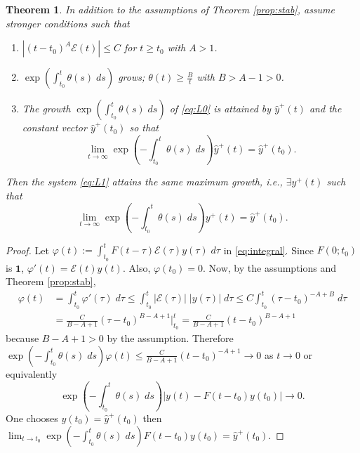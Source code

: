 \documentclass[a4paper,11pt]{article}
\newcounter{Theorem}
\newtheorem{theorem}[Theorem]{Theorem}
\theoremstyle{remark}
\begin{document}
\begin{theorem} \label{prop:stab2}
In addition to the assumptions of Theorem \ref{prop:stab}, assume stronger conditions such that
\begin{enumerate}
  \item $|(t-t_0)^A \mathcal{E}(t)| \le C$ for $t\ge t_0$ with $A>1$. 
  \item $\exp\left(\int_{t_0}^t \theta(s)\; ds\right)$ grows; $\theta(t) \ge \frac{B}{t}$ with $B>A-1>0$.
  \item The growth $\exp\left(\int_{t_0}^t \theta(s)\; ds\right)$ of \eqref{eq:L0} is attained by $\hat{y}^+(t)$ and the constant vector $\hat{y}^+(t_0)$ so that 
  $$ \lim_{t \rightarrow \infty} \exp\left(-\int_{t_0}^t \theta(s)\; ds\right)\hat{y}^+(t) = \hat{y}^+(t_0).$$
\end{enumerate}
Then the system \eqref{eq:L1} attains the same maximum growth, i.e., $\exists {y}^+(t)$  such that
  $$ \lim_{t \rightarrow \infty} \exp\left(-\int_{t_0}^t \theta(s)\; ds\right){y}^+(t) = \hat{y}^+(t_0).$$
\end{theorem}
\begin{proof}
Let $\varphi(t):= \int_{t_0}^t F(t-\tau) \mathcal{E}(\tau)y(\tau) \; d\tau$ in \eqref{eq:integral}. Since $F(0;t_0)$ is $\mathbf{1}$, $\varphi'(t) = \mathcal{E}(t)y(t)$. Also, $\varphi(t_0)=0$. Now, by the assumptions and Theorem \ref{prop:stab},
\begin{align*}
 \varphi(t) &= \int_{t_0}^t \varphi'(\tau) \;d\tau \le \int_{t_0}^t |\mathcal{E}(\tau)|\;|y(\tau)| \;d\tau \le C\int_{t_0}^t (\tau-t_0)^{-A+B} \;d\tau \\
            &= \frac{C}{B-A+1} (\tau-t_0)^{B-A+1}\bigg|^t_{t_0} = \frac{C}{B-A+1} (t-t_0)^{B-A+1}
\end{align*}
because $B-A+1>0$ by the assumption. Therefore $\exp\left(-\int_{t_0}^t \theta(s)\; ds\right)\varphi(t) \le \frac{C}{B-A+1} (t-t_0)^{-A+1} \rightarrow 0$ as $t \rightarrow 0$ or equivalently
$$ \exp\left(-\int_{t_0}^t \theta(s)\; ds\right)\big|y(t)-F(t-t_0)y(t_0)\big| \rightarrow 0.$$
One chooses $y(t_0)=\hat{y}^+(t_0)$ then $\displaystyle\lim_{t\rightarrow t_0}\exp\left(-\int_{t_0}^t \theta(s)\; ds\right)F(t-t_0)y(t_0) = \hat{y}^+(t_0)$.
\end{proof}
\end{document}
